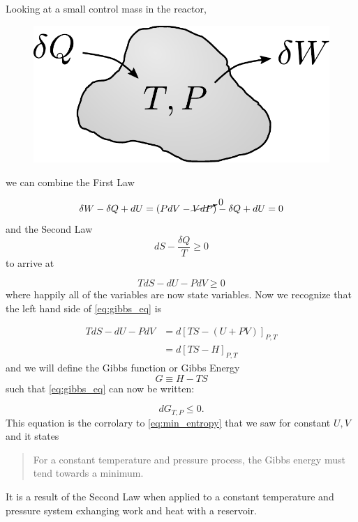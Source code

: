\documentclass[twocolumn]{memoir} %
\begin{document}
Looking at a small control mass in the reactor,
%
\begin{figure}[H]
    \centering
    \includegraphics[width=0.7\columnwidth]{P_T_control_mass}
\end{figure}
%
we can combine the First Law

\begin{equation*}
    \delta W - \delta Q + dU = (P dV - \cancelto{0}{VdP}) - \delta Q + dU = 0
\end{equation*}
%
and the Second Law
%
\begin{equation*}
    dS - \frac{\delta Q}{T} \geq 0
\end{equation*}
%
to arrive at

\begin{equation}
    TdS - dU - PdV \geq 0
    \label{eq:gibbs_eq}
\end{equation}
%
where happily all of the variables are now state variables.  Now we recognize that the left hand side
of \cref{eq:gibbs_eq} is

\begin{equation*}
    \begin{split}
        TdS - dU - PdV &= d\left[TS - (U + PV)\right]_{P,T}\\
        &= d\left[TS - H\right]_{P,T}
    \end{split}
\end{equation*}
%
and we will define the Gibbs function or Gibbs Energy
%
\begin{equation}
    G \equiv H - TS
    \label{eq:gibbs_energy}
\end{equation}
%
such that \cref{eq:gibbs_eq} can now be written:

\begin{equation*}
    dG_{T,P} \leq 0.
\end{equation*}
%
This equation is the corrolary to \cref{eq:min_entropy} that we saw for constant $U, V$ and it
states

\begin{quote}
    For a constant temperature and pressure process, the Gibbs energy must
    tend towards a minimum.
\end{quote}
%
It is a result of the Second Law when applied to a constant temperature and pressure system exhanging
work and heat with a reservoir.  
\end{document}
